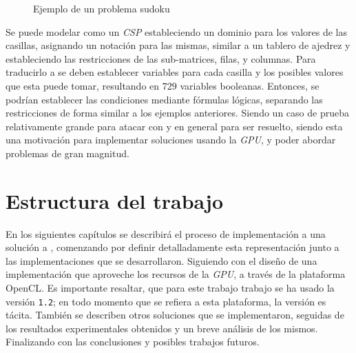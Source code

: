 \begin{figure}
  \centering
  \caption{Ejemplo de un problema sudoku}
  \label{fig:sudoku}
\end{figure}

Se puede modelar como un \textit{CSP} estableciendo un dominio para los valores de las casillas, asignando un notación para las mismas, similar a un tablero de ajedrez y estableciendo las restricciones de las sub-matrices, filas, y columnas. Para traducirlo a \sat se deben establecer variables para cada casilla y los posibles valores que esta puede tomar, resultando en $729$ variables booleanas. Entonces, se podrían establecer las condiciones mediante fórmulas lógicas, separando las restricciones de forma similar a los ejemplos anteriores. Siendo un caso de prueba relativamente grande para atacar con \sat y en general para ser resuelto, siendo esta una motivación para implementar soluciones usando la \textit{GPU}, y poder abordar problemas de gran magnitud.

\section{Estructura del trabajo}

En los siguientes capítulos se describirá el proceso de implementación a una solución a \sat, comenzando por definir detalladamente esta representación junto a las implementaciones que se desarrollaron. Siguiendo con el diseño de una implementación que aproveche los recursos de la \textit{GPU}, a través de la plataforma OpenCL. Es importante resaltar, que para este trabajo trabajo se ha usado la versión \texttt{1.2}; en todo momento que se refiera a esta plataforma, la versión es tácita. También se describen otros soluciones que se implementaron, seguidas de los resultados experimentales obtenidos y un breve análisis de los mismos. Finalizando con las conclusiones y posibles trabajos futuros.
